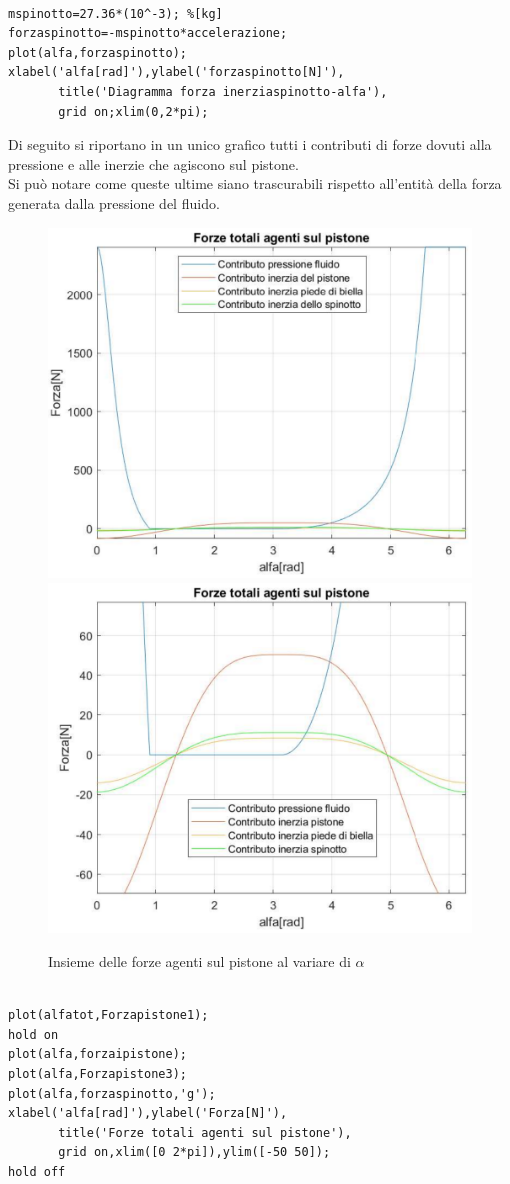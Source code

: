 \begin{lstlisting}[frame=trBL]
%Grafico forze di inerzia dovute alla massa dello spinotto

mspinotto=27.36*(10^-3); %[kg]
forzaspinotto=-mspinotto*accelerazione;
plot(alfa,forzaspinotto);
xlabel('alfa[rad]'),ylabel('forzaspinotto[N]'),
       title('Diagramma forza inerziaspinotto-alfa'),
       grid on;xlim(0,2*pi);
\end{lstlisting}
Di seguito si riportano in un unico grafico tutti i contributi di forze dovuti alla pressione e alle inerzie che agiscono sul pistone.\\
Si può notare come queste ultime siano trascurabili rispetto all’entità della forza generata dalla pressione del fluido.
\begin{figure}[h]
\centering
   {\includegraphics[width=.48\textwidth]{Immagini/GraficoInsiemeForze1.png}} \quad
   {\includegraphics[width=.48\textwidth]{Immagini/GraficoInsiemeForze2.png}}
\caption{Insieme delle forze agenti sul pistone al variare di $\alpha$}
\label{fig:GraficoInsiemeForze}
\end{figure}
\newpage
\begin{lstlisting}[frame=trBL]
%Grafico insieme delle forze

plot(alfatot,Forzapistone1);
hold on     
plot(alfa,forzaipistone);
plot(alfa,Forzapistone3);
plot(alfa,forzaspinotto,'g');
xlabel('alfa[rad]'),ylabel('Forza[N]'),
       title('Forze totali agenti sul pistone'),
       grid on,xlim([0 2*pi]),ylim([-50 50]);
hold off
\end{lstlisting}
